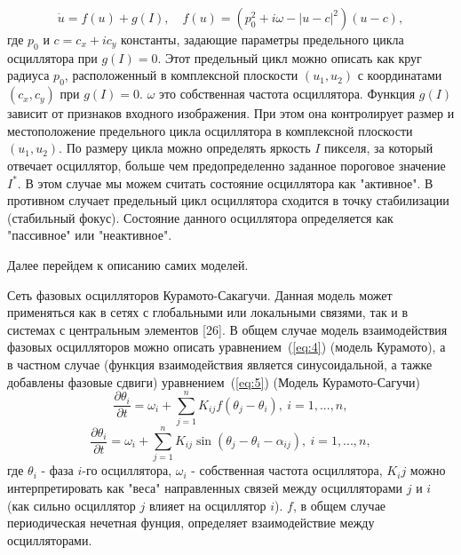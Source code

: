 \documentclass[14pt, russian]{scrartcl}
\begin{document}
\begin{enumerate}
        \begin{equation}\label{eq:3}
            \dot{u} = f(u) + g(I), \quad f(u) = (p^2_0 + i\omega - |u - c|^2)(u - c),
        \end{equation}где $p_0$ и $c = c_x + ic_y$ константы, задающие параметры предельного цикла осциллятора при $g(I) = 0$. Этот предельный цикл можно описать как круг радиуса $p_0$, расположенный в комплексной плоскости $(u_1, u_2)$ с координатами $(c_x, c_y)$ при $g(I) = 0$. $\omega$ это собственная частота осциллятора. 
        Функция $g(I)$ зависит от признаков входного изображения. При этом она контролирует размер и местоположение предельного цикла осциллятора в комплексной плоскости $(u_1, u_2)$. По размеру цикла можно определять яркость $I$ пикселя, за который отвечает осциллятор, больше чем предопределенно заданное пороговое значение $I^*$.
        В этом случае мы можем считать состояние осциллятора как "активное". В противном случает предельный цикл осциллятора сходится в точку стабилизации (стабильный фокус). Состояние данного осциллятора определяется как "пассивное" или "неактивное".
\end{enumerate}

Далее перейдем к описанию самих моделей.

Сеть фазовых осцилляторов Курамото-Сакагучи. Данная модель может применяться как в сетях с глобальными или локальными связями, так и в системах с центральным элементов [26]. В общем случае модель взаимодействия фазовых осцилляторов можно описать уравнением~(\ref{eq:4}) (модель Курамото), а в частном случае (функция взаимодействия является синусоидальной, а тажке добавлены фазовые сдвиги) уравнением~(\ref{eq:5}) (Модель Курамото-Сагучи)
\begin{equation}\label{eq:4}
    \frac{\partial \theta_i}{\partial t} = \omega_i + \sum_{j = 1}^{n}K_{ij} f(\theta_j - \theta_i), \ i = 1,...,n,
\end{equation}
\begin{equation}\label{eq:5}
    \frac{\partial \theta_i}{\partial t} = \omega_i + \sum_{j = 1}^{n}K_{ij} \sin(\theta_j - \theta_i - \alpha_{ij}), \ i = 1,...,n,
\end{equation}где $\theta_i$ - фаза $i$-го осциллятора, $\omega_i$ - собственная частота осциллятора, $K_ij$ можно интерпретировать как "веса" направленных связей между осцилляторами $j$ и $i$ (как сильно осциллятор $j$ влияет на осциллятор $i$). $f$, в общем случае периодическая нечетная фунция, определяет взаимодействие между осцилляторами.
\end{document}
